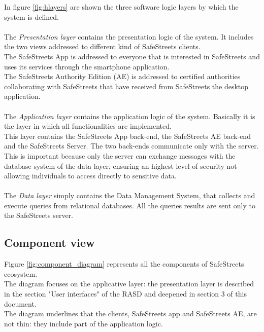 \documentclass{article}
\begin{document}
		In figure \ref{fig:hlayers}	are shown the three software logic layers by which the system is defined.\\
		\\
		The \textit{Presentation layer} contains the presentation logic of the system. It includes the two views addressed to different kind of SafeStreets clients.\\ The SafeStreets App is addressed to everyone that is interested in SafeStreets and uses its services through the smartphone application.\\
		The SafeStreets Authority Edition (AE) is addressed to certified authorities collaborating with SafeStreets that have received from SafeStreets the desktop application.\\
		\\
		The \textit{Application layer} contains the application logic of the system. Basically it is the layer in which all functionalities are implemented.\\
		This layer contains the SafeStreets App back-end, the SafeStreets AE back-end and the SafeStreets Server. The two back-ends communicate only with the server. This is important because only the server can exchange messages with the database system of the data layer, ensuring an highest level of security not allowing individuals to access directly to sensitive data.\\
		\\
		The \textit{Data layer} simply contains the Data Management System, that collects and execute queries from relational databases. All the queries results are sent only to the SafeStreets server.
		
		\subsection{Component view}
		Figure \ref{fig:component_diagram} represents all the components of SafeStreets ecosystem.\\
		The diagram focuses on the applicative layer: the presentation layer is described in the section "User interfaces" of the RASD and deepened in section 3 of this document.\\
		The diagram underlines that the clients, SafeStreets app and SafeStreets AE, are not thin: they include part of the application logic.\\
		
\end{document}
